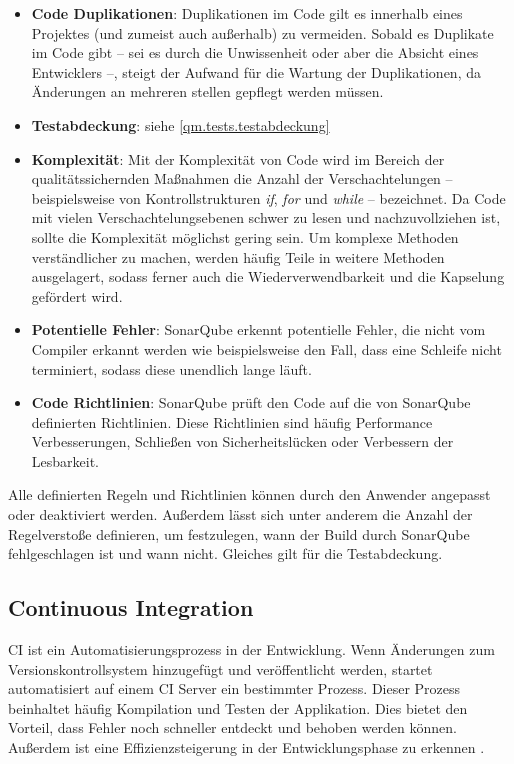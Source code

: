 			\begin{itemize}
				\item \textbf{Code Duplikationen}: Duplikationen im Code gilt es innerhalb eines Projektes (und zumeist auch außerhalb) zu vermeiden. Sobald es Duplikate im Code gibt -- sei es durch die Unwissenheit oder aber die Absicht eines Entwicklers --, steigt der Aufwand für die Wartung der Duplikationen, da Änderungen an mehreren stellen gepflegt werden müssen.
				\item \textbf{Testabdeckung}: siehe \autoref{qm.tests.testabdeckung}
				\item \textbf{Komplexität}: Mit der Komplexität von Code wird im Bereich der qualitätssichernden Maßnahmen die Anzahl der Verschachtelungen -- beispielsweise von Kontrollstrukturen \textit{if}, \textit{for} und \textit{while} -- bezeichnet. Da Code mit vielen Verschachtelungsebenen schwer zu lesen und nachzuvollziehen ist, sollte die Komplexität möglichst gering sein. Um komplexe Methoden verständlicher zu machen, werden häufig Teile in weitere Methoden ausgelagert, sodass ferner auch die Wiederverwendbarkeit und die Kapselung gefördert wird. 
				\item \textbf{Potentielle Fehler}: SonarQube erkennt potentielle Fehler, die nicht vom Compiler erkannt werden wie beispielsweise den Fall, dass eine Schleife nicht terminiert, sodass diese unendlich lange läuft. 
				\item \textbf{Code Richtlinien}: SonarQube prüft den Code auf die von SonarQube definierten Richtlinien. Diese Richtlinien sind häufig Performance Verbesserungen, Schließen von Sicherheitslücken oder Verbessern der Lesbarkeit. 
			\end{itemize}
		
			Alle definierten Regeln und Richtlinien können durch den Anwender angepasst oder deaktiviert werden. Außerdem lässt sich unter anderem die Anzahl der Regelverstoße definieren, um festzulegen, wann der Build durch SonarQube fehlgeschlagen ist und wann nicht. Gleiches gilt für die Testabdeckung. 
		
		\subsection{Continuous Integration}
		
			\ac{CI} ist ein Automatisierungsprozess in der Entwicklung. Wenn Änderungen zum Versionskontrollsystem hinzugefügt und veröffentlicht werden, startet automatisiert auf einem \acs{CI} Server ein bestimmter Prozess. Dieser Prozess beinhaltet häufig Kompilation und Testen der Applikation. Dies bietet den Vorteil, dass Fehler noch schneller entdeckt und behoben werden können. Außerdem ist eine Effizienzsteigerung in der Entwicklungsphase zu erkennen \cite{Fowler.2292020}. 
			
